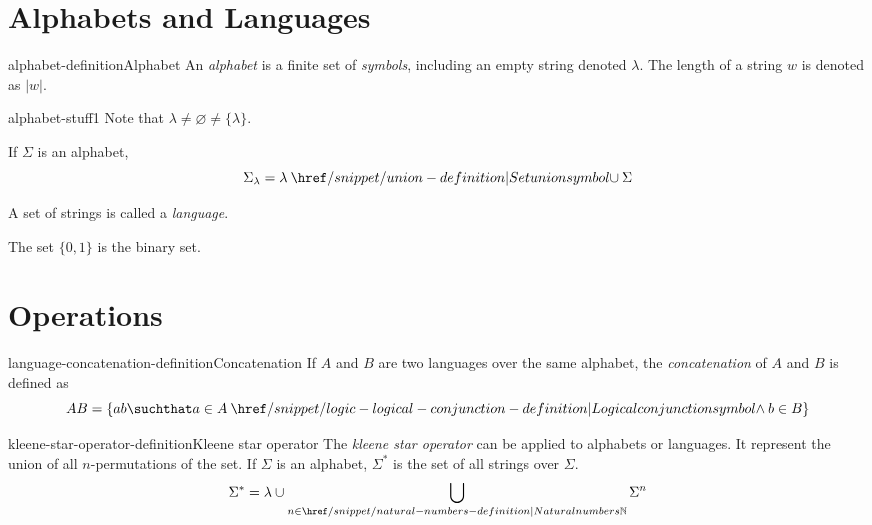 \documentclass[preview]{standalone}
\newcommand{\emptyString}{\lambda}
\begin{document}
\genpage

\section{Alphabets and Languages}

\begin{snippetdefinition}{alphabet-definition}{Alphabet}
    An \textit{alphabet} is a finite set of \textit{symbols},
    including an empty string denoted \(\emptyString\).
    The length of a string \(w\) is denoted as \(|w|\).
\end{snippetdefinition}

\begin{snippet}{alphabet-stuff1}
    Note that \(\emptyString \neq \varnothing \neq \{\emptyString\}\).

    If \(\Sigma\) is an alphabet,
    \[
        \Sigma_\emptyString = \emptyString \union \Sigma
    \]

    A set of strings is called a \textit{language}.

    The set \(\{0,1\}\) is the binary set.
\end{snippet}

\section{Operations}

\begin{snippetdefinition}{language-concatenation-definition}{Concatenation}
    If \(A\) and \(B\) are two languages over the same alphabet,
    the \textit{concatenation} of \(A\) and \(B\) is defined as
    \[
        AB = \{ab \suchthat a \in A \land b \in B\}
    \]
\end{snippetdefinition}

\begin{snippetdefinition}{kleene-star-operator-definition}{Kleene star operator}
    The \textit{kleene star operator} can be applied to alphabets or languages.
    It represent the union of all \(n\)-permutations of the set.
    If \(\Sigma\) is an alphabet, \(\Sigma^*\) is the set of all strings over \(\Sigma\).
    \[
        \Sigma^* = \emptyString \cup \bigcup_{n\in\naturalnumbers} \Sigma^n
    \]
\end{snippetdefinition}

\end{document}
